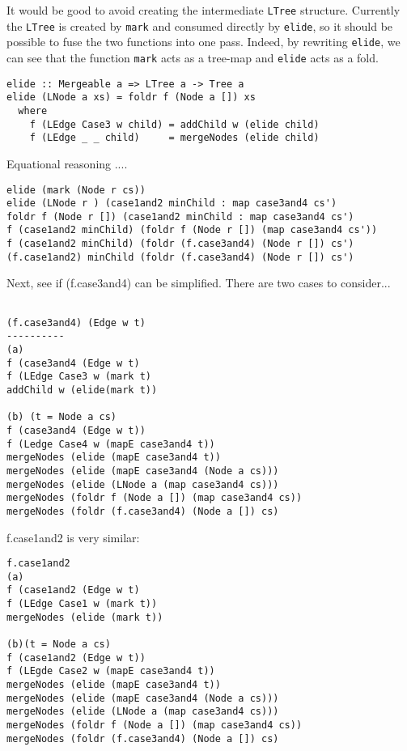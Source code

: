 \documentclass{jfp}
\begin{document}
It would be good to avoid creating the intermediate {\tt LTree}
structure. Currently the {\tt LTree} is created by {\tt mark} and
consumed directly by {\tt elide}, so it should be possible to fuse the
two functions into one pass.  Indeed, by rewriting {\tt elide}, we can
see that the function {\tt mark} acts as a tree-map and {\tt elide}
acts as a fold.

\begin{verbatim}
elide :: Mergeable a => LTree a -> Tree a
elide (LNode a xs) = foldr f (Node a []) xs
  where
    f (LEdge Case3 w child) = addChild w (elide child)
    f (LEdge _ _ child)     = mergeNodes (elide child)
\end{verbatim}

Equational reasoning ....

\begin{verbatim}
elide (mark (Node r cs))
elide (LNode r ) (case1and2 minChild : map case3and4 cs')
foldr f (Node r []) (case1and2 minChild : map case3and4 cs')
f (case1and2 minChild) (foldr f (Node r []) (map case3and4 cs'))
f (case1and2 minChild) (foldr (f.case3and4) (Node r []) cs')
(f.case1and2) minChild (foldr (f.case3and4) (Node r []) cs')
\end{verbatim}

Next, see if (f.case3and4) can be simplified.
There are two cases to consider...
\begin{verbatim}

(f.case3and4) (Edge w t)
----------
(a)
f (case3and4 (Edge w t)
f (LEdge Case3 w (mark t)
addChild w (elide(mark t))

(b) (t = Node a cs)
f (case3and4 (Edge w t))
f (Ledge Case4 w (mapE case3and4 t))
mergeNodes (elide (mapE case3and4 t))
mergeNodes (elide (mapE case3and4 (Node a cs)))
mergeNodes (elide (LNode a (map case3and4 cs)))
mergeNodes (foldr f (Node a []) (map case3and4 cs))
mergeNodes (foldr (f.case3and4) (Node a []) cs)

\end{verbatim}

f.case1and2 is very similar:

\begin{verbatim}
f.case1and2
(a)
f (case1and2 (Edge w t)
f (LEdge Case1 w (mark t))
mergeNodes (elide (mark t))

(b)(t = Node a cs)
f (case1and2 (Edge w t))
f (LEgde Case2 w (mapE case3and4 t))
mergeNodes (elide (mapE case3and4 t))
mergeNodes (elide (mapE case3and4 (Node a cs)))
mergeNodes (elide (LNode a (map case3and4 cs)))
mergeNodes (foldr f (Node a []) (map case3and4 cs))
mergeNodes (foldr (f.case3and4) (Node a []) cs)

\end{verbatim}
\end{document}
